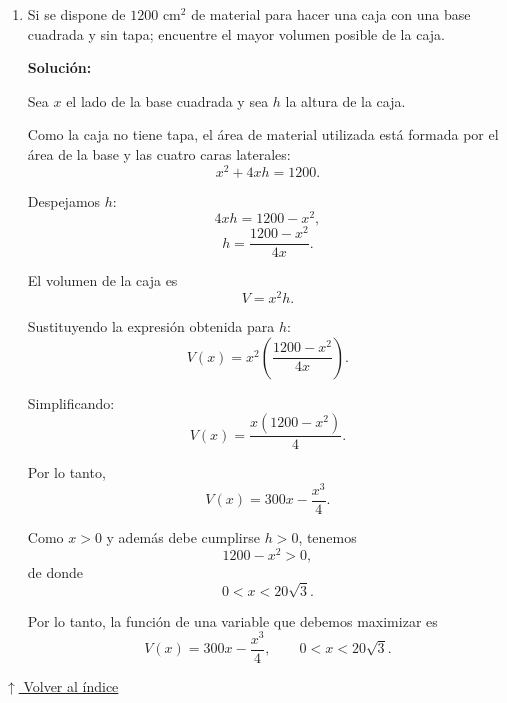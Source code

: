 \documentclass[12pt]{article}
\newcommand{\solucion}{%
    \vspace{0.8em}%
    \textbf{Solución:}%
}
\newcommand{\volverindice}{%
    \vspace{1em}%
    \begin{flushright}%
        \hyperlink{indice}{\small $\uparrow$ Volver al índice}%
    \end{flushright}%
}
\begin{document}
\begin{enumerate}[label=\alph*.-]
    El perímetro del rectángulo es
    \[
    P=2x+2y.
    \]

    Sustituyendo $y$:
    \[
    P(x)=2x+2\left(\frac{1000}{x}\right).
    \]

    Por lo tanto, la función de una variable que debemos minimizar es
    \[
    \boxed{
    P(x)=2x+\frac{2000}{x}
    },
    \qquad x>0.
    \]

    Una vez obtenido el valor óptimo de $x$, la otra dimensión se
    obtiene mediante
    \[
    y=\frac{1000}{x}.
    \]


    \vspace{1cm}

				\newpage

    \item Si se dispone de $1200 \text{ cm}^2$ de material para hacer
    una caja con una base cuadrada y sin tapa; encuentre el mayor
    volumen posible de la caja.

    \solucion

    Sea $x$ el lado de la base cuadrada y sea $h$ la altura de la caja.

    Como la caja no tiene tapa, el área de material utilizada está
    formada por el área de la base y las cuatro caras laterales:
    \[
    x^2+4xh=1200.
    \]

    Despejamos $h$:
    \[
    4xh=1200-x^2,
    \]
    \[
    h=\frac{1200-x^2}{4x}.
    \]

    El volumen de la caja es
    \[
    V=x^2h.
    \]

    Sustituyendo la expresión obtenida para $h$:
    \[
    V(x)
    =
    x^2\left(\frac{1200-x^2}{4x}\right).
    \]

    Simplificando:
    \[
    V(x)
    =
    \frac{x(1200-x^2)}{4}.
    \]

    Por lo tanto,
    \[
    \boxed{
    V(x)=300x-\frac{x^3}{4}
    }.
    \]

    Como $x>0$ y además debe cumplirse $h>0$, tenemos
    \[
    1200-x^2>0,
    \]
    de donde
    \[
    0<x<20\sqrt3.
    \]

    Por lo tanto, la función de una variable que debemos maximizar es
    \[
    \boxed{
    V(x)=300x-\frac{x^3}{4},
    \qquad 0<x<20\sqrt3.
    }
    \]

\end{enumerate}

\volverindice
\newpage
\end{document}
